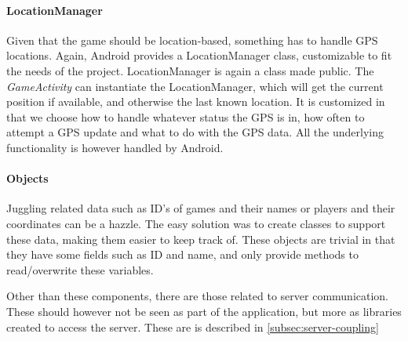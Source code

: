 \paragraph{LocationManager}
Given that the game should be location-based, something has to handle GPS locations. Again, Android provides a LocationManager class, customizable to fit the needs of the project. LocationManager is again a class made public. The \textit{GameActivity} can instantiate the LocationManager, which will get the current position if available, and otherwise the last known location. It is customized in that we choose how to handle whatever status the GPS is in, how often to attempt a GPS update and what to do with the GPS data. All the underlying functionality is however handled by Android.

\paragraph{Objects}
Juggling related data such as ID's of games and their names or players and their coordinates can be a hazzle. The easy solution was to create classes to support these data, making them easier to keep track of. These objects are trivial in that they have some fields such as ID and name, and only provide methods to read/overwrite these variables.

Other than these components, there are those related to server communication. These should however not be seen as part of the application, but more as libraries created to access the server. These are is described in \ref{subsec:server-coupling}